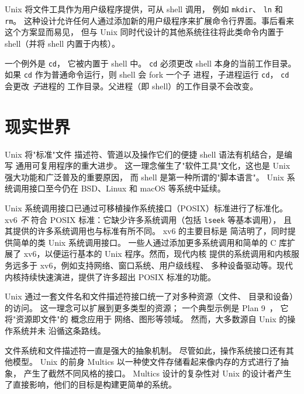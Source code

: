 Unix 将文件工具作为用户级程序提供，可从 shell 调用，
例如
\lstinline{mkdir}、
\lstinline{ln}
和
\lstinline{rm}。
这种设计允许任何人通过添加新的用户级程序来扩展命令行界面。事后看来这个方案显而易见，
但与 Unix 同时代设计的其他系统往往将此类命令内置于
shell（并将 shell 内置于内核）。

一个例外是
\lstinline{cd}，
它被内置于 shell
 中。
\lstinline{cd}
必须更改 shell 本身的当前工作目录。如果
\lstinline{cd}
作为普通命令运行，则 shell 会 fork 一个子
进程，子进程运行
\lstinline{cd}，
\lstinline{cd}
会更改
\textit{子}进程的
工作目录。父进程（即
shell）的工作目录不会改变。
\section{现实世界}

Unix 将"标准"文件
描述符、管道以及操作它们的便捷 shell 语法有机结合，是编写
通用可复用程序的重大进步。
这一理念催生了"软件工具"文化，这也是
Unix 强大功能和广泛普及的重要原因，
而 shell 是第一种所谓的"脚本语言"。
Unix 系统调用接口至今仍在
BSD、Linux 和 macOS 等系统中延续。

Unix 系统调用接口已通过可移植操作系统接口（POSIX）标准进行了标准化。
xv6
\textit{不}
符合 POSIX 标准：它缺少许多系统调用（包括
\lstinline{lseek} 等基本调用），
且其提供的许多系统调用也与标准有所不同。
xv6 的主要目标是
简洁明了，同时提供简单的类 Unix 系统调用接口。
一些人通过添加更多系统调用和简单的
C 库扩展了 xv6，以便运行基本的 Unix 程序。然而，现代内核
提供的系统调用和内核服务远多于
xv6，例如支持网络、窗口系统、用户级线程、
多种设备驱动等。现代内核持续快速演进，提供了许多超出 POSIX 标准的功能。

Unix 通过一套文件名和文件描述符接口统一了对多种资源（文件、
目录和设备）的访问。
这一理念可以扩展到更多类型的资源；
一个典型示例是 Plan 9~\cite{Presotto91plan9}，
它将"资源即文件"的
概念应用于
网络、图形等领域。
然而，大多数源自 Unix 的操作系统并未
沿循这条路线。

文件系统和文件描述符一直是强大的抽象机制。
尽管如此，操作系统接口还有其他模型。
Unix 的前身 Multics
以一种使文件存储看起来像内存的方式进行了抽象，
产生了截然不同风格的接口。
Multics 设计的复杂性对 Unix 的设计者产生了直接影响，他们的目标是构建更简单的系统。

